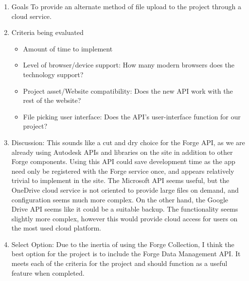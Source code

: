 \documentclass[letterpaper, 10pt, draftclsnofoot, compsoc, onecolumn]{IEEEtran}
\begin{document}
\begin{enumerate}
\begin{itemize}
					
				\end{itemize}
			\item{Goals}
			To provide an alternate method of file upload to the project through a cloud service.
			
			\item{Criteria being evaluated}
			\begin{itemize}
					\item{Amount of time to implement}
					\item{Level of browser/device support: How many modern browsers does the technology support?}
					\item{Project asset/Website compatibility: Does the new API work with the rest of the website?}
					\item{File picking user interface: Does the API's user-interface function for our project?}
				\end{itemize}
			\item{Discussion:}
			This sounds like a cut and dry choice for the Forge API, as we are already using Autodesk APIs and libraries on the site in addition to other Forge components. Using this API could save development time as the app need only be registered with the Forge service once, and appears relatively trivial to implement in the site. The Microsoft API seems useful, but the OneDrive cloud service is not oriented to provide large files on demand, and configuration seems much more complex. On the other hand, the Google Drive API seems like it could be a suitable backup. The functionality seems slightly more complex, however this would provide cloud access for users on the most used cloud platform.
			\item{Select Option:}
			Due to the inertia of using the Forge Collection, I think the best option for the project is to include the Forge Data Management API. It meets each of the criteria for the project and should function as a useful feature when completed. 
		\end{enumerate}
		
\end{document}
